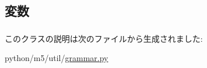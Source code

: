\subsection{変数}
\hypertarget{classm5_1_1util_1_1grammar_1_1ParseError_a87da3d8264af1c9427605148f20dd9c4}{
\subsubsection[{token}]{}}
\label{classm5_1_1util_1_1grammar_1_1ParseError_a87da3d8264af1c9427605148f20dd9c4}


このクラスの説明は次のファイルから生成されました:\begin{DoxyCompactItemize}
\item 
python/m5/util/\hyperlink{grammar_8py}{grammar.py}\end{DoxyCompactItemize}
